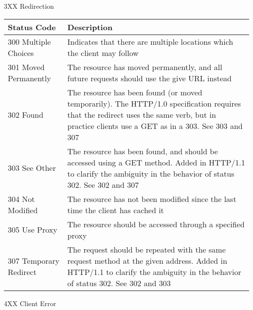 \documentclass[final,table]{beamer}
\begin{document}
\begin{frame}{}
\begin{block}{\huge 3XX Redirection}
      \begin{tabular}{p{} p{}}
        Status Code & Description \\ \hline
        300 Multiple Choices & Indicates that there are multiple locations which the client may follow \\
        301 Moved Permanently & The resource has moved permanently, and all future requests should use the give URL instead \\
        302 Found & The resource has been found (or moved temporarily). The HTTP/1.0 specification requires that the redirect uses the same verb, but in practice clients use a GET as in a 303. See 303 and 307 \\
        303 See Other & The resource has been found, and should be accessed using a GET method. Added in HTTP/1.1 to clarify the ambiguity in the behavior of status 302. See 302 and 307 \\
        304 Not Modified & The resource has not been modified since the last time the client has cached it \\
        305 Use Proxy & The resource should be accessed through a specified proxy \\
        307 Temporary Redirect & The request should be repeated with the same request method at the given address. Added in HTTP/1.1 to clarify the ambiguity in the behavior of status 302. See 302 and 303
      \end{tabular}
    \end{block}
    \begin{block}{\huge 4XX Client Error}

      \vspace{0.3in}


\end{block}
\end{frame}
\end{document}

